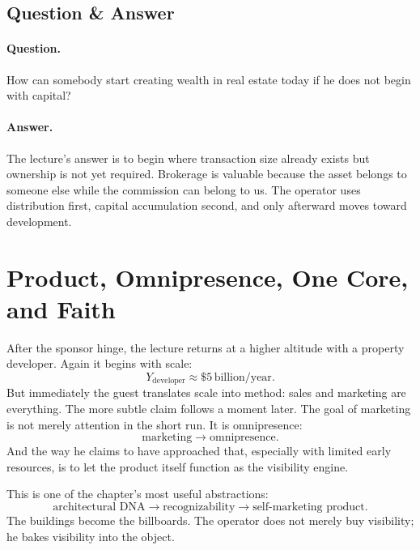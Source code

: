 \subsection{Question \& Answer}

\paragraph{Question.} How can somebody start creating wealth in real estate today if he does not begin with capital?

\paragraph{Answer.} The lecture's answer is to begin where transaction size already exists but ownership is not yet required. Brokerage is valuable because the asset belongs to someone else while the commission can belong to us. The operator uses distribution first, capital accumulation second, and only afterward moves toward development.

\section{Product, Omnipresence, One Core, and Faith}

After the sponsor hinge, the lecture returns at a higher altitude with a property developer. Again it begins with scale:
\begin{equation}
Y_{\text{developer}} \approx \$5\,\text{billion}/\text{year}.
\end{equation}
But immediately the guest translates scale into method: sales and marketing are everything. The more subtle claim follows a moment later. The goal of marketing is not merely attention in the short run. It is omnipresence:
\begin{equation}
\text{marketing} \to \text{omnipresence}.
\end{equation}
And the way he claims to have approached that, especially with limited early resources, is to let the product itself function as the visibility engine.

This is one of the chapter's most useful abstractions:
\begin{equation}
\text{architectural DNA}
\to
\text{recognizability}
\to
\text{self-marketing product}.
\end{equation}
The buildings become the billboards. The operator does not merely buy visibility; he bakes visibility into the object.

